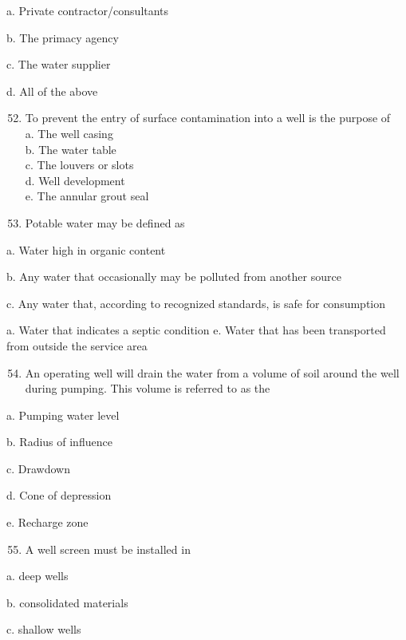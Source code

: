 \documentclass[10pt]{article}
\begin{document}
a. Private contractor/consultants

b. The primacy agency

c. The water supplier

d. All of the above

\begin{enumerate}
  \setcounter{enumi}{51}
  \item To prevent the entry of surface contamination into a well is the purpose of\\
a. The well casing\\
b. The water table\\
c. The louvers or slots\\
d. Well development\\
e. The annular grout seal\\

  \item Potable water may be defined as

\end{enumerate}

a. Water high in organic content

b. Any water that occasionally may be polluted from another source

c. Any water that, according to recognized standards, is safe for consumption

a. Water that indicates a septic condition e. Water that has been transported from outside the service area

\begin{enumerate}
  \setcounter{enumi}{53}
  \item An operating well will drain the water from a volume of soil around the well during pumping. This volume is referred to as the
\end{enumerate}

a. Pumping water level

b. Radius of influence

c. Drawdown

d. Cone of depression

e. Recharge zone

\begin{enumerate}
  \setcounter{enumi}{54}
  \item A well screen must be installed in
\end{enumerate}

a. deep wells

b. consolidated materials

c. shallow wells
\end{document}
